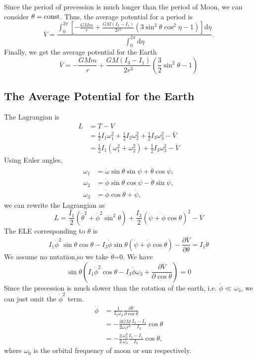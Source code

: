 \documentclass[%
 reprint,
 amsmath,amssymb,
 aps,
]{revtex4-1}
\begin{document}
Since the period of precession is much longer than the period of Moon, we can consider $\theta=\rm const$. Thus, the average potential for a period is
\begin{equation}
    \overline{V}=\frac{\int_0^{2\pi}[-\frac{GMm}{r}+\frac{GM(I_3-I_1)}{2r^3}(3\sin^2\theta\cos^2\eta-1)]\mathrm{d}\eta}{\int_0^{2\pi}\mathrm{d}\eta}.
\end{equation}
Finally, we get the average potential for the Earth
\begin{equation}
    \overline{V}=-\frac{GMm}{r}+\frac{GM(I_3-I_1)}{2r^3}(\frac{3}{2}\sin^2\theta-1)
\end{equation}
\subsection{The Average Potential for the Earth}
The Lagrangian is 
\begin{align*}
    L&=T-V \\
    &=\frac{1}{2}I_1\omega_1^2+\frac{1}{2}I_2\omega_2^2+\frac{1}{2}I_3\omega_3^2-\overline{V} \\
    &=\frac{1}{2}I_1\left(\omega_1^2+\omega_2^2\right)+\frac{1}{2}I_3\omega_3^2-\overline{V}
\end{align*}
Using Euler angles,
\begin{align}
    \omega_1&=\dot{\omega}\sin \theta\sin \psi+\dot{\theta}\cos\psi, \\
    \omega_2&=\dot{\phi}\sin\theta\cos\psi-\dot{\theta}\sin\psi, \\
    \omega_3&=\dot{\phi}\cos{\theta}+\dot{\psi},
\end{align}
we can rewrite the Lagrangian as
\begin{equation}
    L=\frac{I_1}{2}(\dot{\theta}^2+\dot{\phi}^2\sin^2\theta)+\frac{I_3}{2}(\dot{\psi}+\dot{\phi}\cos\theta)^2-\overline{V}
\end{equation}
The ELE corresponding to $\theta$ is 
\begin{equation}
    I_1\dot{\phi}^2\sin\theta\cos\theta-I_3\dot{\phi}\sin\theta(\dot{\psi}+\dot{\phi}\cos\theta)-\frac{\partial\overline{V}}{\partial\theta}=I_1\ddot{\theta}
\end{equation}
We assume no nutation,so we take $\ddot{\theta}$=0. We have
\begin{equation}
    \sin\theta\left(I_1\dot{\phi}^2\cos\theta-I_3\dot{\phi}\omega_3+\frac{\partial\overline{V}}{\partial\cos\theta}\right)=0
\end{equation}
Since the precession is much slower than the rotation of the earth, i.e. $\dot{\phi}\ll\omega_3$, we can just omit the $\dot{\phi}^2$ term.
\begin{equation}
\begin{aligned}
    \dot{\phi}&=\frac{1}{I_3\omega_3}\frac{\partial\overline{V}}{\partial\cos\theta} \\
    &=-\frac{3GM}{2\omega_3r^3}\frac{I_3-I_1}{I_3}\cos\theta \\
    &=-\frac{3}{2}\frac{\omega_0^2}{\omega_3}\frac{I_3-I_1}{I_3}\cos\theta,
\end{aligned}
\label{angularvelocity}
\end{equation}
where $\omega_0$ is the orbital frequency of moon or sun respectively.
\end{document}
